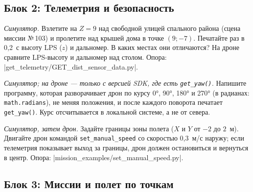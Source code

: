 \subsection{Блок 2: Телеметрия и безопасность}

\begin{taskbox}[(П) Высотомер]
\emph{Симулятор.} Взлетите на $Z = 9$ над свободной улицей спального района (сцена миссии №\,103) и пролетите над крышей дома в точке $(9; -7)$. Печатайте раз в 0,2~с высоту LPS ($z$) и дальномер. В каких местах они отличаются? На дроне сравните LPS-высоту и дальномер над столом.
Опора: \fpath|get_telemetry/GET_dist_sensor_data.py|.
\end{taskbox}

\begin{taskbox}[(П) Компас]
\emph{Симулятор; на дроне --- только с версией SDK, где есть \texttt{get\_yaw()}.} Напишите программу, которая разворачивает дрон по курсу 0°, 90°, 180° и 270° (в радианах: \verb|math.radians|), не меняя положения, и после каждого поворота печатает \verb|get_yaw()|. Курс отсчитывается в локальной системе, а не от севера.
\end{taskbox}

\begin{taskbox}
\emph{Симулятор, затем дрон.} Задайте границы зоны полета ($X$ и $Y$ от $-2$ до $2$~м). Двигайте дрон командой \verb|set_manual_speed| со скоростью 0,3~м/с наружу; если телеметрия показывает выход за границы, дрон должен остановиться и вернуться в центр.
Опора: \fpath|mission_examples/set_manual_speed.py|.
\end{taskbox}

\subsection{Блок 3: Миссии и полет по точкам}

